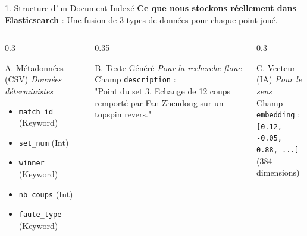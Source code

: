 \documentclass[aspectratio=169, 11pt]{beamer}
\begin{document}
\begin{frame}{1. Structure d'un Document Indexé}
    \textbf{Ce que nous stockons réellement dans Elasticsearch} :
    Une fusion de 3 types de données pour chaque point joué.
    
    \vspace{0.2cm}
    
    \begin{columns}
        \begin{column}{0.3\textwidth}
            \begin{block}{A. Métadonnées (CSV)}
            \textit{Données déterministes}\\
            \begin{itemize}
                \item \texttt{match\_id} (Keyword)
                \item \texttt{set\_num} (Int)
                \item \texttt{winner} (Keyword)
                \item \texttt{nb\_coups} (Int)
                \item \texttt{faute\_type} (Keyword)
            \end{itemize}
            \end{block}
        \end{column}
        \begin{column}{0.35\textwidth}
            \begin{block}{B. Texte Généré}
            \textit{Pour la recherche floue}\\
            Champ \texttt{description} :\\
            "Point du set 3. Echange de 12 coups remporté par Fan Zhendong sur un topspin revers."
            \end{block}
        \end{column}
        \begin{column}{0.3\textwidth}
            \begin{block}{C. Vecteur (IA)}
            \textit{Pour le sens}\\
            Champ \texttt{embedding} :\\
            \texttt{[0.12, -0.05, 0.88, ...]}
            \\(384 dimensions)
            \end{block}
        \end{column}
    \end{columns}
\end{frame}
\end{document}
